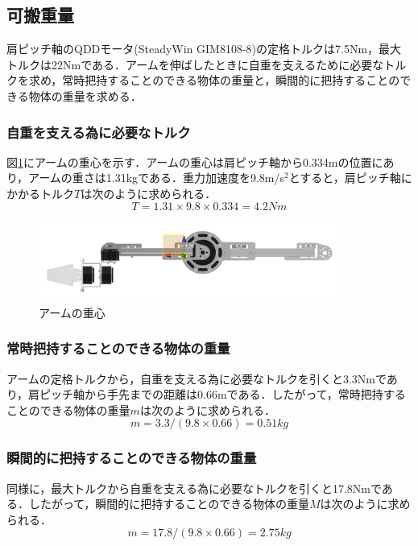 \subsection{可搬重量}
肩ピッチ軸のQDDモータ(SteadyWin GIM8108-8)の定格トルクは7.5Nm，最大トルクは22Nmである．アームを伸ばしたときに自重を支えるために必要なトルクを求め，常時把持することのできる物体の重量と，瞬間的に把持することのできる物体の重量を求める．
\subsubsection{自重を支える為に必要なトルク}
図\ref{fig:CoG}にアームの重心を示す．アームの重心は肩ピッチ軸から0.334mの位置にあり，アームの重さは1.31kgである．重力加速度を9.8m/s$^2$とすると，肩ピッチ軸にかかるトルク$T$は次のように求められる．
\begin{equation}
  T = 1.31 \times 9.8 \times 0.334 = 4.2 Nm
\end{equation}
\begin{figure}[h]
  \centering
  \includegraphics[width=10cm]{images/design/CoG.png}
  \caption{アームの重心}
  \label{fig:CoG}
\end{figure}

\subsubsection{常時把持することのできる物体の重量}
アームの定格トルクから，自重を支える為に必要なトルクを引くと3.3Nmであり，肩ピッチ軸から手先までの距離は0.66mである．したがって，常時把持することのできる物体の重量$m$は次のように求められる．
\begin{equation}
  m = 3.3 / (9.8 \times 0.66) = 0.51kg
\end{equation}

\subsubsection{瞬間的に把持することのできる物体の重量}
同様に，最大トルクから自重を支える為に必要なトルクを引くと17.8Nmである．したがって，瞬間的に把持することのできる物体の重量$M$は次のように求められる．
\begin{equation}
  m = 17.8 / (9.8 \times 0.66) = 2.75kg
\end{equation}


\clearpage
\newpage